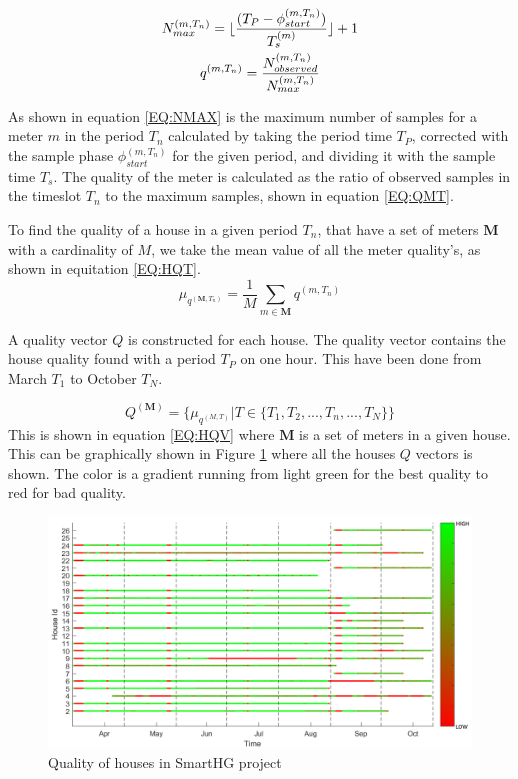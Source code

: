 \begin{gather}
		N_{max}^{(m,T_n)} = \lfloor \frac{(T_{P}-\phi_{start}^{(m,T_n)})}{T_s^{(m)}}\rfloor + 1 \label{EQ:NMAX} \\
		q^{(m,T_n)} = \frac{N_{observed}^{(m,T_n)}}{ N_{max}^{(m,T_n)} } \label{EQ:QMT}
\end{gather}

As shown in equation \ref{EQ:NMAX} is the maximum number of samples for a meter $m$ in the period $T_n$ calculated by taking the period time $T_P$, corrected with the sample phase $\phi_{start}^{(m,T_n)}$ for the given period, and dividing it with the sample time $T_s$. The  quality of the meter is calculated as the ratio of observed samples in the timeslot $T_n$ to the maximum samples, shown in equation \ref{EQ:QMT}. 

To find the quality of a house in a given period $T_n$, that have a set of meters $\mathbf{M}$ with a cardinality of $M$, we take the mean value of all the meter quality's, as shown in equitation \ref{EQ:HQT}.  
\begin{equation}
	\mu_{q^{(\mathbf{M},T_n)}} = \frac{1}{M} \sum_{m \in \mathbf{M}} q^{(m,T_n)}
	\label{EQ:HQT}
\end{equation}



A quality vector $Q$ is constructed for each house. The quality vector contains the house quality found with a period $T_P$ on one hour. This have been done from March $T_1$ to October $T_N$. 

\begin{equation}
	Q^{(\mathbf{M})} = \{ \mu_{q^{(M,T)}} | T \in \{T_1, T_2, ... ,T_n,..., T_N  \} \}
	\label{EQ:HQV}
\end{equation}
This is shown in equation \ref{EQ:HQV} where $\mathbf{M}$ is a set of meters in a given house. This can be graphically shown in Figure \ref{fig:SmartHGQuality} where all the houses $Q$ vectors is shown. The color is a gradient running from light green for the best quality to red for bad quality.
\begin{figure}[H]
\centering
\includegraphics[width=1\textwidth]{billeder/QualityBig.png}
\caption{Quality of houses in SmartHG project}
\label{fig:SmartHGQuality}
\end{figure} 

